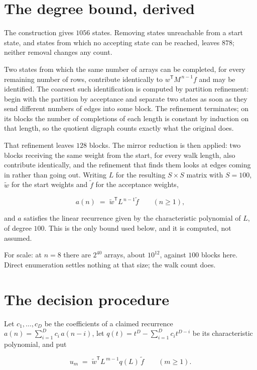 \documentclass[11pt]{article}
\theoremstyle{definition}
\begin{document}
\section{The degree bound, derived}

The construction gives $1056$ states. Removing states unreachable from a start state, and states from which no accepting state can be reached, leaves $878$; neither removal changes any count.

Two states from which the same number of arrays can be completed, for every remaining number of rows, contribute identically to $w^{\mathsf T}M^{\,n-1}f$ and may be identified. The coarsest such identification is computed by partition refinement: begin with the partition by acceptance and separate two states as soon as they send different numbers of edges into some block. The refinement terminates; on its blocks the number of completions of each length is constant by induction on that length, so the quotient digraph counts exactly what the original does.

That refinement leaves $128$ blocks. The mirror reduction is then applied: two blocks receiving the same weight from the start, for every walk length, also contribute identically, and the refinement that finds them looks at edges coming in rather than going out. Writing $L$ for the resulting $S \times S$ matrix with $S = 100$, $\tilde w$ for the start weights and $\tilde f$ for the acceptance weights,

\[a(n) \;=\; \tilde w^{\mathsf T} L^{\,n-1} \tilde f \qquad (n \ge 1),\]

and $a$ satisfies the linear recurrence given by the characteristic polynomial of $L$, of degree $100$. This is the only bound used below, and it is computed, not assumed.

For scale: at $n = 8$ there are $2^{40}$ arrays, about $10^{12}$, against $100$ blocks here. Direct enumeration settles nothing at that size; the walk count does.

\section{The decision procedure}

Let $c_1,\dots,c_D$ be the coefficients of a claimed recurrence $a(n) = \sum_{i=1}^{D} c_i\,a(n-i)$, let $q(t) = t^{D} - \sum_{i=1}^{D} c_i t^{D-i}$ be its characteristic polynomial, and put

\[u_m \;=\; \tilde w^{\mathsf T} L^{\,m-1} q(L)\,\tilde f \qquad (m \ge 1).\]
\end{document}

